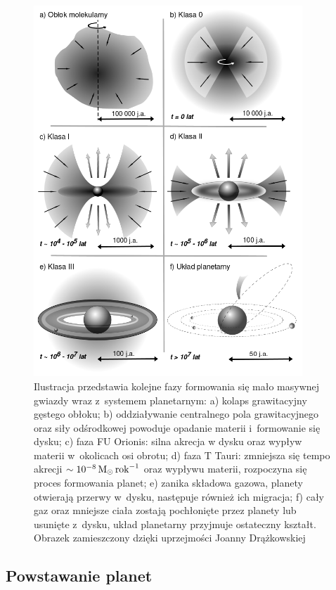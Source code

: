 \begin{figure}[p]
\centering 
\includegraphics[width=0.9\textwidth]{figures/planetformation.png}
\caption{Ilustracja przedstawia kolejne fazy formowania się mało masywnej gwiazdy
   wraz z~systemem planetarnym: a) kolaps grawitacyjny gęstego obłoku; b)
   oddziaływanie centralnego pola grawitacyjnego oraz siły odśrodkowej powoduje
   opadanie materii i~formowanie się dysku; c) faza FU Orionis: silna akrecja w
   dysku oraz wypływ materii w~okolicach osi obrotu; d) faza T Tauri: zmniejsza
   się tempo akrecji $\sim 10^{-8}\hbox{$\mathrm{\thinspace M_{\odot}}$}\hbox{$\thinspace\textrm{rok}$}^{-1}$ oraz wypływu materii,
   rozpoczyna się proces formowania planet; e) zanika składowa gazowa, planety
otwierają przerwy w~dysku, następuje również ich migracja; f) cały gaz oraz
mniejsze ciała zostają pochłonięte przez planety lub usunięte z~dysku, układ
planetarny przyjmuje ostateczny kształt. Obrazek zamieszczony dzięki uprzejmości
Joanny Drążkowskiej}

\label{fig:planet}
\end{figure}

\subsection{Powstawanie planet}

